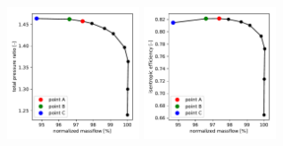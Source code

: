 \documentclass[journal,final]{new-aiaa}
\begin{document}
\begin{figure}[htb]
	\centering   
	\includegraphics[width=0.35\textwidth]{PyPlot/eigen-vs-timedomain/annular-cascade-pr.pdf}
	\includegraphics[width=0.35\textwidth]{PyPlot/eigen-vs-timedomain/annular-cascade-eff.pdf}
	\caption{}
	\label{}
\end{figure}
\end{document}
